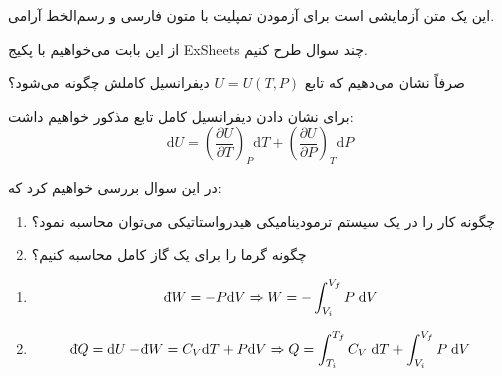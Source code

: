 \documentclass[RTL]{TAATemplate}
\def\dbar{{\mathchar'26\mkern-12mu \mathrm{d}}}
\begin{document}
این یک متن آزمایشی است برای آزمودن تمپلیت با متون فارسی و رسم‌الخط آرامی.

از این بابت می‌خواهیم با پکیج ExSheets چند سوال طرح کنیم.

\begin{question}{2}
    صرفاً نشان می‌دهیم که تابع $U = U(T, P)$ دیفرانسیل کاملش چگونه می‌شود؟
\end{question}
\begin{solution}
برای نشان دادن دیفرانسیل کامل تابع مذکور خواهیم داشت:
$$\mathrm{d}U = \left(\frac{\partial U}{\partial T}\right)_{P} \mathrm{d}T + \left(\frac{\partial U}{\partial P}\right)_{T} \mathrm{d}P$$
\end{solution}

\begin{question}{1}
    در این سوال بررسی خواهیم کرد که:
    \begin{enumerate}[label={\alph*)}]
        \item چگونه کار را در یک سیستم ترمودینامیکی هیدرواستاتیکی می‌توان محاسبه نمود؟
        \item چگونه گرما را برای یک گاز کامل محاسبه کنیم؟
    \end{enumerate}
\end{question}
\begin{solution}
    \begin{enumerate}[label={\alph*)}]
        \item $$\dbar W = -P\mathrm{d}V \Rightarrow W  = -\int_{V_i}^{V_f} P\; \mathrm{d}V$$
        \item $$\dbar Q = \mathrm{d}U - \dbar W = C_{V}\mathrm{d}T + P\mathrm{d}V \Rightarrow Q = \int_{T_i}^{T_f} C_{V}\; \mathrm{d}T + \int_{V_i}^{V_f} P\; \mathrm{d}V$$
    \end{enumerate}
\end{solution}
\end{document}
